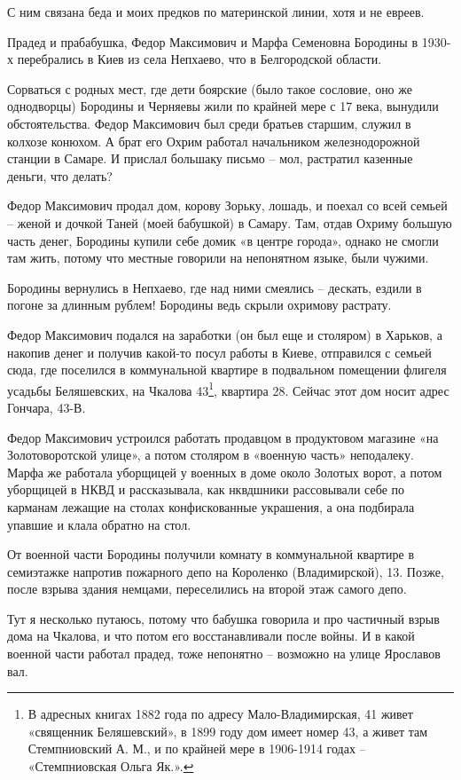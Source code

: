 С ним связана беда и моих предков по материнской линии, хотя и не евреев.

Прадед и прабабушка, Федор Максимович и Марфа Семеновна Бородины в 1930-х перебрались в Киев из села Непхаево, что в Белгородской области. 

Сорваться с родных мест, где дети боярские (было такое сословие, оно же однодворцы) Бородины и Черняевы жили по крайней мере с 17 века, вынудили обстоятельства. Федор Максимович был среди братьев старшим, служил в колхозе конюхом. А брат его Охрим работал начальником железнодорожной станции в Самаре. И прислал большаку письмо – мол, растратил казенные деньги, что делать?

Федор Максимович продал дом, корову Зорьку, лошадь, и поехал со всей семьей – женой и дочкой Таней (моей бабушкой) в Самару. Там, отдав Охриму большую часть денег, Бородины купили себе домик «в центре города», однако не смогли там жить, потому что местные говорили на непонятном языке, были чужими.

Бородины вернулись в Непхаево, где над ними смеялись – дескать, ездили в погоне за длинным рублем! Бородины ведь скрыли охримову растрату. 
 
Федор Максимович подался на заработки (он был еще и столяром) в Харьков, а накопив денег и получив какой-то посул работы в Киеве, отправился с семьей сюда, где поселился в коммунальной квартире в подвальном помещении флигеля усадьбы Беляшевских, на Чкалова 43\footnote{В адресных книгах 1882 года по адресу Мало-Владимирская, 41 живет «священник Беляшевский», в 1899 году дом имеет номер 43, а живет там Стемпниовский А. М., и по крайней мере в 1906-1914 годах – «Стемпниовская Ольга Як.».}, квартира 28. Сейчас этот дом носит адрес Гончара, 43-В.

Федор Максимович устроился работать продавцом в продуктовом магазине «на Золотоворотской улице», а потом столяром в «военную часть» неподалеку. Марфа же работала уборщицей у военных в доме около Золотых ворот, а потом уборщицей в НКВД и рассказывала, как нквдшники рассовывали себе по карманам лежащие на столах конфискованные украшения, а она подбирала упавшие и клала обратно на стол.

От военной части Бородины получили комнату в коммунальной квартире в семиэтажке напротив пожарного депо на Короленко (Владимирской), 13. Позже, после взрыва здания немцами, переселились на второй этаж самого депо.

Тут я несколько путаюсь, потому что бабушка говорила и про частичный взрыв дома на Чкалова, и что потом его восстанавливали после войны. И в какой военной части работал прадед, тоже непонятно – возможно на улице Ярославов вал.

